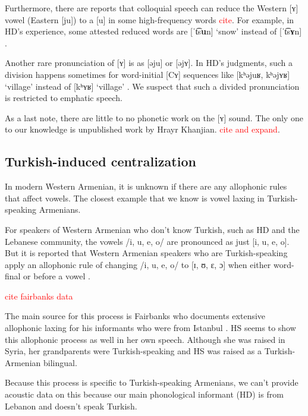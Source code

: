    	Furthermore, there are reports that colloquial speech can reduce the Western [ʏ] vowel (Eastern [ju]) to a [u] in some high-frequency words \textcolor{red}{cite}. For example, in HD's experience, some attested reduced words are [ˈt͡s\textbf{u}n] `snow'  instead of [ˈt͡s\textbf{ʏ}n] . 
   	
   	Another rare pronunciation of [ʏ] is as [əju] or [əjʏ]. In HD's judgments, such a division happens sometimes for word-initial [Cʏ] sequences like [kʰəjuʁ, kʰəjʏʁ] `village' instead of [kʰʏʁ] `village' . We suspect that such a divided pronunciation is restricted to emphatic speech. 
   	
   	As a last note, there are little to no phonetic work on the [ʏ] sound. The only one to our knowledge is unpublished work by Hrayr Khanjian. \textcolor{red}{cite and expand}.
   	
   	
   	
   	\subsection{Turkish-induced centralization}\label{section:segmentalPhono:vowel:centralization}
   	In modern Western Armenian, it is unknown if there are any allophonic rules that affect vowels. The closest example that we know is vowel laxing in Turkish-speaking Armenians. 
   	
   	For speakers of Western Armenian who don't know Turkish, such as HD and the Lebanese community, the vowels /i, u, e, o/ are pronounced as just [i, u, e, o]. But it is reported that Western Armenian speakers who are Turkish-speaking apply an allophonic rule of changing /i, u, e, o/ to [ɪ, ʊ, ɛ, ɔ] when either word-final or before a vowel \citep[3-4]{Fairbanks-1948-PhonologyMorphoWestern}. 
   	
   	\textcolor{red}{cite fairbanks data}
   	
   	
   	The main source for this process is Fairbanks who documents extensive allophonic laxing for his informants who were from Istanbul \citep[1]{Fairbanks-1948-PhonologyMorphoWestern}. HS seems to show this allophonic process as well in her own speech. Although she was raised in Syria, her grandparents were Turkish-speaking and HS was raised as a Turkish-Armenian bilingual. 
   	
   	Because this process is specific to Turkish-speaking Armenians, we can't provide acoustic data on this because our main phonological informant (HD) is from Lebanon and doesn't speak Turkish. 
   	
